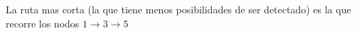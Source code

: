 \begin{homeworkProblem}
\begin{tikzpicture}[shorten >=2pt,,line width=0.4mm,node distance=2cm,on grid,auto]
\end{tikzpicture}


La ruta mas corta (la que tiene menos posibilidades de ser detectado) es la que recorre los nodos $1\rightarrow3\rightarrow5$
%
%
%


\end{homeworkProblem}